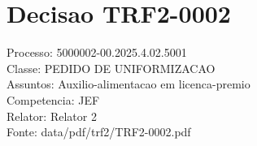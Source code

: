 \documentclass[12pt]{article}
\begin{document}
\section*{Decisao TRF2-0002}
Processo: 5000002-00.2025.4.02.5001\\
Classe: PEDIDO DE UNIFORMIZACAO\\
Assuntos: Auxilio-alimentacao em licenca-premio\\
Competencia: JEF\\
Relator: Relator 2\\
Fonte: data/pdf/trf2/TRF2-0002.pdf
\end{document}
